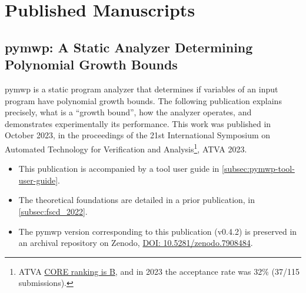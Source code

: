 \section{Published Manuscripts}\label{sec:published-manuscripts}

\pagebreak

\subsection{pymwp: A Static Analyzer Determining Polynomial Growth Bounds}
\label{subsec:pymwp}

pymwp is a static program analyzer that determines if variables of an input program have polynomial growth bounds.
The following publication explains precisely, what is a \enquote{growth bound}, how the analyzer operates, and demonstrates experimentally its performance.
This work was published in October 2023, in the proceedings of the 21st International Symposium on Automated Technology for Verification and Analysis\footnote{ATVA \href{https://portal.core.edu.au/conf-ranks/1357/}{CORE ranking is B}, and in 2023 the acceptance rate was 32\% (37/115 submissions).}, ATVA 2023.

\begin{itemize}
\item This publication is accompanied by a tool user guide in \autoref{subsec:pymwp-tool-user-guide}.
\item The theoretical foundations are detailed in a prior publication, in \autoref{subsec:fscd_2022}.
\item The pymwp version corresponding to this publication (v0.4.2) is preserved in an archival repository on Zenodo, \href{https://zenodo.org/records/7908484}{DOI: 10.5281/zenodo.7908484}.
\end{itemize}
\hfill

\pagebreak

\nolinenumbers

\linenumbers
